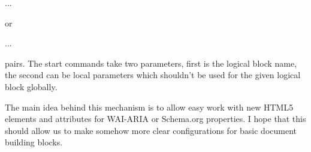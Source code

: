 \begin{texsource}
\InlineElementStart ... \InlineElementEnd
\end{texsource}

\noindent or

\begin{texsource}
\BlockElementStart ... \BlockElementEnd 
\end{texsource}

\noindent pairs. The start commands take two
parameters, first is the logical block name, the second can be local
parameters which shouldn't be used for the given logical block globally.

The main idea behind this mechanism is to allow easy work with new HTML5
elements and attributes for WAI-ARIA or Schema.org properties. I hope that
this should allow us to make somehow more clear configurations for basic
document building blocks.

